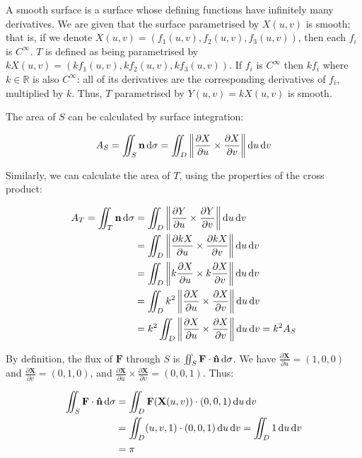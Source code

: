 
A smooth surface is a surface whose defining functions have infinitely many derivatives. We are given that the surface parametrised by $X(u, v)$ is smooth; that is, if we denote $X(u, v) = (f_1(u, v), f_2(u, v), f_3(u, v))$, then each $f_i$ is $C^{\infty}$. $T$ is defined as being parametrised by $kX(u, v) = (kf_1(u, v), kf_2(u, v), kf_3(u, v))$. If $f_i$ is $C^{\infty}$ then $kf_i$ where $k \in \mathbb{R}$ is also $C^{\infty}$: all of its derivatives are the corresponding derivatives of $f_i$, multiplied by $k$. Thus, $T$ parametrised by $Y(u, v) = kX(u, v)$ is smooth.

The area of $S$ can be calculated by surface integration:

\begin{align*}
  A_S = \iint_S \mathbf{n} \mathop{}\!\mathrm{d} \sigma = \iint_D \left\lVert\frac{\partial X}{\partial u} \times \frac{\partial X}{\partial v}\right\rVert \mathop{}\!\mathrm{d} u \mathop{}\!\mathrm{d} v
\end{align*}

Similarly, we can calculate the area of $T$, using the properties of the cross product:

\begin{align*}
  A_T = \iint_T \mathbf{n} \diff \sigma &= \iint_D \norm{\frac{\partial Y}{\partial u} \times \frac{\partial Y}{\partial v}} \diff u \diff v \\
  &= \iint_D \norm{\frac{\partial kX}{\partial u} \times \frac{\partial kX}{\partial v}} \diff u \diff v \\
  &= \iint_D \norm{k\frac{\partial X}{\partial u} \times k\frac{\partial X}{\partial v}} \diff u \diff v \\
  &= \iint_D k^2 \norm{\frac{\partial X}{\partial u} \times \frac{\partial X}{\partial v}} \diff u \diff v \\
  &= k^2 \iint_D \norm{\frac{\partial X}{\partial u} \times \frac{\partial X}{\partial v}} \diff u \diff v = k^2 A_S\\
\end{align*}

By definition, the flux of $\mathbf{F}$ through $S$ is $\iint_S \mathbf{F} \cdot \mathbf{\hat{n}} \mathop{}\!\mathrm{d} \sigma$. We have $\frac{\partial \mathbf{X}}{\partial u} = (1, 0, 0)$ and $\frac{\partial \mathbf{X}}{\partial v} = (0, 1, 0)$, and $\frac{\partial \mathbf{X}}{\partial u} \times \frac{\partial \mathbf{X}}{\partial v} = (0, 0, 1)$. Thus:

\begin{align*}
  \iint_S \mathbf{F} \cdot \mathbf{\hat{n}} \mathop{}\!\mathrm{d} \sigma &= \iint_D \mathbf{F}(\mathbf{X}(u, v)) \cdot (0, 0, 1) \mathop{}\!\mathrm{d} u \mathop{}\!\mathrm{d} v \\
  &= \iint_D (u, v, 1) \cdot (0, 0, 1) \mathop{}\!\mathrm{d} u \mathop{}\!\mathrm{d} v = \iint_D 1 \mathop{}\!\mathrm{d} u \mathop{}\!\mathrm{d} v \\
  &= \pi
\end{align*}

